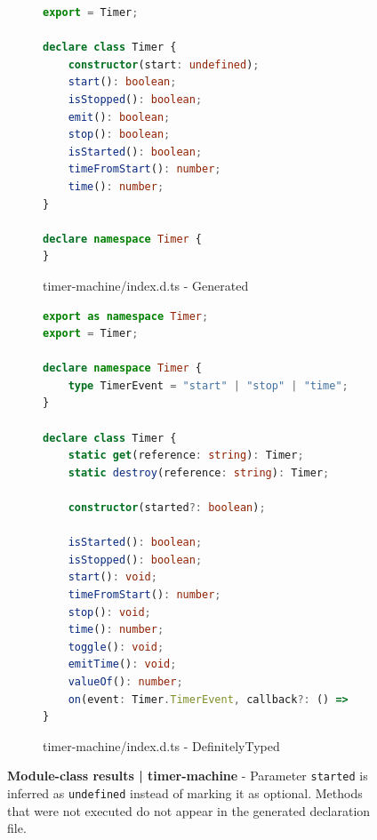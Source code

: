 \documentclass[a4paper,english,cleveref, autoref]{lipics-v2019}
\begin{document}
\begin{figure}[tp]
    \centering
    \begin{subfigure}{0.48\linewidth}
      \begin{lstlisting}[language=TypeScript]
export = Timer;

declare class Timer {
    constructor(start: undefined);
    start(): boolean;
    isStopped(): boolean;
    emit(): boolean;
    stop(): boolean;
    isStarted(): boolean;
    timeFromStart(): number;
    time(): number;
}

declare namespace Timer {
}
      \end{lstlisting}
      \caption{timer-machine/index.d.ts - Generated}
    \end{subfigure}
    \hfill
    \begin{subfigure}{0.48\linewidth}
      \begin{lstlisting}[language=TypeScript]
export as namespace Timer;
export = Timer;

declare namespace Timer {
    type TimerEvent = "start" | "stop" | "time";
}

declare class Timer {
    static get(reference: string): Timer;
    static destroy(reference: string): Timer;

    constructor(started?: boolean);

    isStarted(): boolean;
    isStopped(): boolean;
    start(): void;
    timeFromStart(): number;
    stop(): void;
    time(): number;
    toggle(): void;
    emitTime(): void;
    valueOf(): number;
    on(event: Timer.TimerEvent, callback?: () => void): void;
}
      \end{lstlisting}
      \caption{timer-machine/index.d.ts - DefinitelyTyped}
    \end{subfigure}

    \caption{\textbf{Module-class results | timer-machine} - Parameter \lstinline{started} is inferred as \lstinline{undefined} instead of marking it as optional. Methods that were not executed do not appear in the generated declaration file.}
    \label{fig:experiments-results-module-class-timer-machine}
\end{figure}
\end{document}
